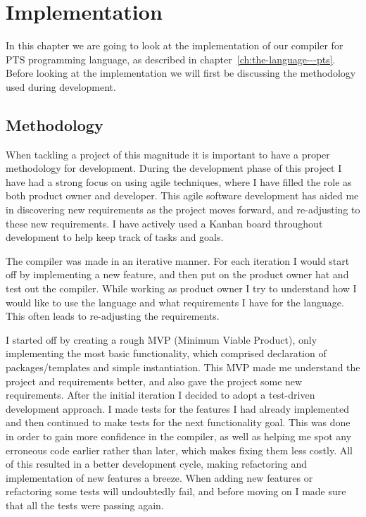 
\chapter{Implementation}\label{ch:implementation}

In this chapter we are going to look at the implementation of our compiler for PTS programming language, as described in chapter~\vref{ch:the-language---pts}.
Before looking at the implementation we will first be discussing the methodology used during development.

\section{Methodology}\label{sec:methodology}

When tackling a project of this magnitude it is important to have a proper methodology for development.
During the development phase of this project I have had a strong focus on using agile techniques, where I have filled the role as both product owner and developer.
This agile software development has aided me in discovering new requirements as the project moves forward, and re-adjusting to these new requirements.
I have actively used a Kanban board throughout development to help keep track of tasks and goals.

The compiler was made in an iterative manner.
For each iteration I would start off by implementing a new feature, and then put on the product owner hat and test out the compiler.
While working as product owner I try to understand how I would like to use the language and what requirements I have for the language.
This often leads to re-adjusting the requirements.

I started off by creating a rough MVP (Minimum Viable Product), only implementing the most basic functionality, which comprised declaration of packages/templates and simple instantiation.
This MVP made me understand the project and requirements better, and also gave the project some new requirements.
After the initial iteration I decided to adopt a test-driven development approach.
I made tests for the features I had already implemented and then continued to make tests for the next functionality goal.
This was done in order to gain more confidence in the compiler, as well as helping me spot any erroneous code earlier rather than later, which makes fixing them less costly.
All of this resulted in a better development cycle, making refactoring and implementation of new features a breeze.
When adding new features or refactoring some tests will undoubtedly fail, and before moving on I made sure that all the tests were passing again.


